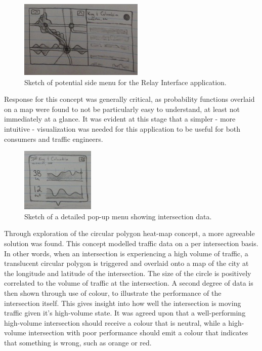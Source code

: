 \documentclass{report}
\begin{document}
\begin{figure}[htbp!]
  \begin{centering}
    \includegraphics[scale=1]{figures/wire-4.png}
    \caption{Sketch of potential side menu for the Relay Interface application.}
    \label{fig:wire-3}
  \end{centering}
\end{figure}

Response for this concept was generally critical, as probability functions overlaid on a map were found to not be particularly easy to understand, at least not immediately at a glance.
It was evident at this stage that a simpler - more intuitive - visualization was needed for this application to be useful for both consumers and traffic engineers.

\begin{figure}[htbp!]
  \begin{centering}
    \includegraphics[scale=1]{figures/wire-5.png}
    \caption{Sketch of a detailed pop-up menu showing intersection data.}
    \label{fig:wire-4}
  \end{centering}
\end{figure}

Through exploration of the circular polygon heat-map concept, a more agreeable solution was found.
This concept modelled traffic data on a per intersection basis.
In other words, when an intersection is experiencing a high volume of traffic, a translucent circular polygon is triggered and overlaid onto a map of the city at the longitude and latitude of the intersection.
The size of the circle is positively correlated to the volume of traffic at the intersection.
A second degree of data is then shown through use of colour, to illustrate the performance of the intersection itself.
This gives insight into how well the intersection is moving traffic given it's high-volume state.
It was agreed upon that a well-performing high-volume intersection should receive a colour that is neutral, while a high-volume intersection with poor performance should emit a colour that indicates that something is wrong, such as orange or red.
\end{document}
